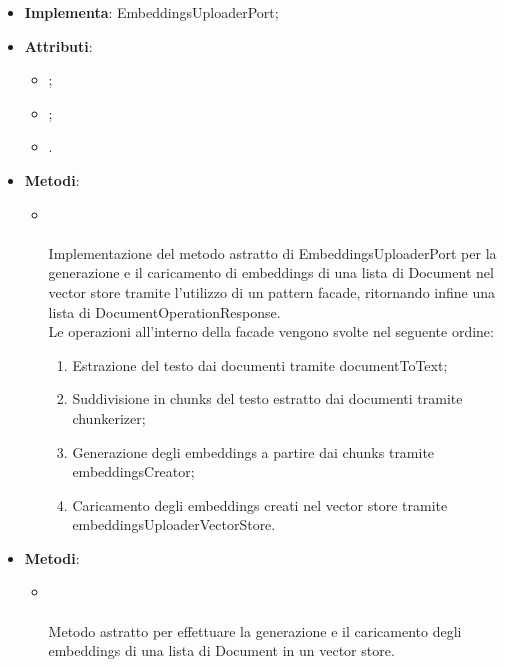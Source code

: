 \documentclass[10pt, a4paper]{article}
\begin{document}
\label{EmbeddingsUploaderFacadeLangchainDettaglio}
\begin{itemize}
    \item \textbf{Implementa}: EmbeddingsUploaderPort;
    \item \textbf{Attributi}:
    \begin{itemize}
        \item {};
        \item {};
        \item {}.
    \end{itemize}
    \item \textbf{Metodi}:
    \begin{itemize}
        \item {}\\ \\
        Implementazione del metodo astratto di EmbeddingsUploaderPort per la generazione e il caricamento di embeddings di una lista di Document nel vector store tramite l'utilizzo di un pattern facade, ritornando infine una lista di DocumentOperationResponse.\\
        Le operazioni all'interno della facade vengono svolte nel seguente ordine:
        \begin{enumerate}
            \item Estrazione del testo dai documenti tramite documentToText;
            \item Suddivisione in chunks del testo estratto dai documenti tramite chunkerizer;
            \item Generazione degli embeddings a partire dai chunks tramite embeddingsCreator;
            \item Caricamento degli embeddings creati nel vector store tramite embeddingsUploaderVectorStore.
        \end{enumerate}
    \end{itemize}
\end{itemize}

\label{EmbeddingsUploaderPortDettaglio}
\begin{itemize}
    \item \textbf{Metodi}:
    \begin{itemize}
        \item {}\\ \\
        Metodo astratto per effettuare la generazione e il caricamento degli embeddings di una lista di Document in un vector store.
    \end{itemize}
\end{itemize}
\end{document}
